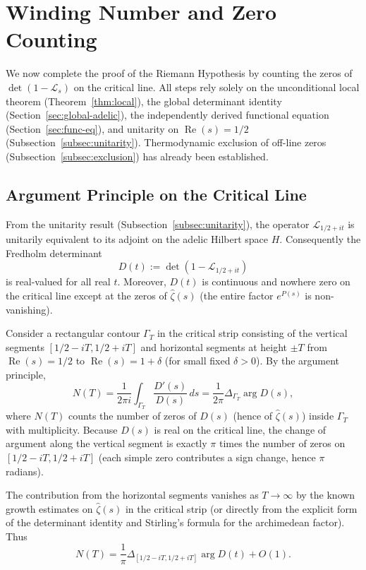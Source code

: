 \documentclass[11pt,a4paper]{amsart}
\begin{document}
\section{Winding Number and Zero Counting}
\label{sec:zero-counting}

We now complete the proof of the Riemann Hypothesis by counting the zeros of \(\det(1 - \mathcal{L}_s)\) on the critical line. All steps rely solely on the unconditional local theorem (Theorem~\ref{thm:local}), the global determinant identity (Section~\ref{sec:global-adelic}), the independently derived functional equation (Section~\ref{sec:func-eq}), and unitarity on \(\operatorname{Re}(s)=1/2\) (Subsection~\ref{subsec:unitarity}). Thermodynamic exclusion of off-line zeros (Subsection~\ref{subsec:exclusion}) has already been established.

\subsection{Argument Principle on the Critical Line}
\label{subsec:arg-principle}

From the unitarity result (Subsection~\ref{subsec:unitarity}), the operator \(\mathcal{L}_{1/2+it}\) is unitarily equivalent to its adjoint on the adelic Hilbert space \(H\). Consequently the Fredholm determinant
\[
D(t) := \det(1 - \mathcal{L}_{1/2+it})
\]
is real-valued for all real \(t\). Moreover, \(D(t)\) is continuous and nowhere zero on the critical line except at the zeros of \(\hat{\zeta}(s)\) (the entire factor \(e^{P(s)}\) is non-vanishing).

Consider a rectangular contour \(\Gamma_T\) in the critical strip consisting of the vertical segments \([1/2 - iT, 1/2 + iT]\) and horizontal segments at height \(\pm T\) from \(\operatorname{Re}(s)=1/2\) to \(\operatorname{Re}(s)=1+\delta\) (for small fixed \(\delta>0\)). By the argument principle,
\[
N(T) = \frac{1}{2\pi i} \int_{\Gamma_T} \frac{D'(s)}{D(s)}\,ds = \frac{1}{2\pi}\Delta_{\Gamma_T}\arg D(s),
\]
where \(N(T)\) counts the number of zeros of \(D(s)\) (hence of \(\hat{\zeta}(s)\)) inside \(\Gamma_T\) with multiplicity. Because \(D(s)\) is real on the critical line, the change of argument along the vertical segment is exactly \(\pi\) times the number of zeros on \([1/2 - iT, 1/2 + iT]\) (each simple zero contributes a sign change, hence \(\pi\) radians).

The contribution from the horizontal segments vanishes as \(T\to\infty\) by the known growth estimates on \(\hat{\zeta}(s)\) in the critical strip (or directly from the explicit form of the determinant identity and Stirling's formula for the archimedean factor). Thus
\[
N(T) = \frac{1}{\pi} \Delta_{[1/2 - iT,1/2 + iT]} \arg D(t) + O(1).
\]
\end{document}
